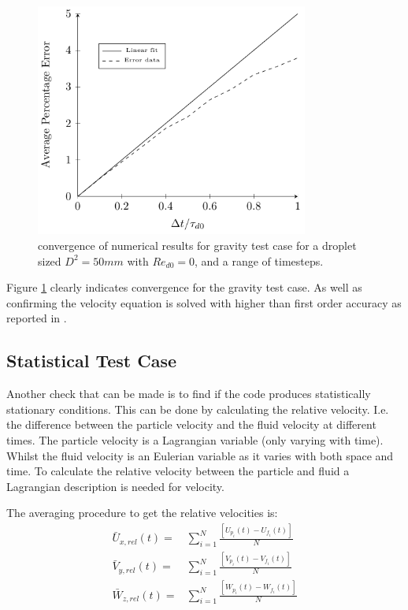 \documentclass[../Interim_Report_Master]{subfiles}
\begin{document}
\begin{figure}[H]
	\centering
	\includegraphics[width=0.8\textwidth]{./Diagrams/Gravity_Verification_Test/Gravity_Convergence/Gravity_Convergence.pdf}
	\caption{convergence of numerical results for gravity test case for a droplet sized $D^2=50mm$ with $Re_{d0}=0$, and a range of timesteps.}
	\label{gravity_con}
\end{figure}

Figure \ref{gravity_con} clearly indicates convergence for the gravity test case. As well as confirming the velocity equation is solved with higher than first order accuracy as reported in \cite{Elijah_GPU_Report}.

\subsection{Statistical Test Case}\label{stat_test_case}
Another check that can be made is to find if the code produces statistically stationary conditions. This can be done by calculating the relative velocity. I.e. the difference between the particle velocity and the fluid velocity at different times. The particle velocity is a Lagrangian variable (only varying with time). Whilst the fluid velocity is an Eulerian variable as it varies with both space and time. To calculate the relative velocity between the particle and fluid a Lagrangian description is needed for velocity.

The averaging procedure to get the relative velocities is:
\begin{subequations}
\begin{eqnarray}
\bar{U}_{x,rel}(t) =& \sum_{i=1}^{N}\frac{\left[U_{p_i}(t)-U_{f_i}(t)\right]}{N} \\
\bar{V}_{y,rel}(t) =& \sum_{i=1}^{N}\frac{\left[V_{p_i}(t)-V_{f_i}(t)\right]}{N} \\
\bar{W}_{z,rel}(t) =& \sum_{i=1}^{N}\frac{\left[W_{p_i}(t)-W_{f_i}(t)\right]}{N}
\end{eqnarray}
\end{subequations}
\end{document}
